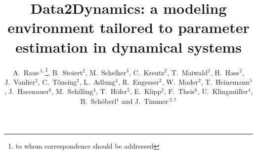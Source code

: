 \documentclass{bioinfo}
\begin{document}

\title[Data2Dynamics]{Data2Dynamics: a modeling environment tailored to parameter 
estimation in dynamical systems}
\author[A.~Raue \textit{et~al.}]{
A.~Raue\,$^{1,}$\footnote{to whom correspondence 
should be addressed}, 
B.~Steiert$^{2}$, 
M.~Schelker$^{3}$, 
C.~Kreutz$^{2}$, 
T.~Maiwald$^{2}$, 
H.~Hass$^{2}$, 
J.~Vanlier$^{2}$, 
C.~T\"onsing$^{2}$, 
L.~Adlung$^{4}$, 
R.~Engesser$^{2}$, 
W.~Mader$^{2}$, 
T.~Heinemann$^{5}$, 
J.~Hasenauer$^{6}$, 
M.~Schilling$^{4}$, 
T.~H\"ofer$^{5}$, 
E.~Klipp$^{2}$, 
F.~Theis$^{6}$, 
U.~Klingm\"uller$^{4}$,
B.~Sch\"oberl$^{1}$ 
and J.~Timmer\,$^{2,7}$}
\address{$^{1}$Merrimack Pharmaceuticals Inc., 02139 Cambridge, MA, USA\\
$^{2}$University of Freiburg, Institute for Physics, 79104 Freiburg, Germany\\
$^{3}$Humboldt-Universit\"at zu Berlin, Theoretical Biophysics, 10115 Berlin, Germany\\
$^{4}$German Cancer Research Center, 69120 Heidelberg, Germany.\\
$^{5}$BioQuant, University of Heidelberg, 69120 Freiburg, Germany\\
$^{6}$Helmholtz Center Munich, 85764 Neuherberg, Germany.\\
$^{7}$BIOSS Centre for Biological Signalling Studies, University of Freiburg, 79104 Freiburg, Germany.}



\maketitle
\end{document}
